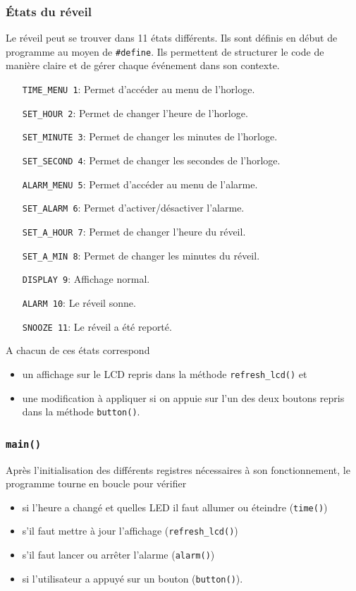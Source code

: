 \documentclass[12pt,a4paper]{article}
\begin{document}
    \subsubsection{\'Etats du réveil}
    Le réveil peut se trouver dans 11 états différents. Ils sont définis en début de programme au moyen de \texttt{\#define}. Ils permettent de structurer le code de manière claire et de gérer chaque événement dans son contexte.
    \begin{itemize}
    \item[\texttt{TIME\_MENU 1}:] Permet d'accéder au menu de l'horloge.
	\item[\texttt{SET\_HOUR 2}:] Permet de changer l'heure de l'horloge.
	\item[\texttt{SET\_MINUTE 3}:] Permet de changer les minutes de l'horloge.
	\item[\texttt{SET\_SECOND 4}:] Permet de changer les secondes de l'horloge.
	\item[\texttt{ALARM\_MENU 5}:] Permet d'accéder au menu de l'alarme.
	\item[\texttt{SET\_ALARM 6}:] Permet d'activer/désactiver l'alarme.
	\item[\texttt{SET\_A\_HOUR 7}:] Permet de changer l'heure du réveil.
	\item[\texttt{SET\_A\_MIN 8}:] Permet de changer les minutes du réveil.
	\item[\texttt{DISPLAY 9}:] Affichage normal.
	\item[\texttt{ALARM 10}:] Le réveil sonne.
	\item[\texttt{SNOOZE 11}:] Le réveil a été reporté.\\
    \end{itemize}
    
    A chacun de ces états correspond 
    \begin{itemize}
    \item un affichage sur le LCD repris dans la méthode \texttt{refresh\_lcd()} et
    \item une modification à appliquer si on appuie sur l'un des deux boutons repris dans la méthode \texttt{button()}.
    \end{itemize} 
    \subsubsection{\texttt{main()}}
    Après l'initialisation des différents registres nécessaires à son fonctionnement, le programme tourne en boucle pour vérifier
    \begin{itemize}
    \item si l'heure a changé et quelles LED il faut allumer ou éteindre (\texttt{time()})
    \item s'il faut mettre à jour l'affichage (\texttt{refresh\_lcd()})
    \item s'il faut lancer ou arrêter l'alarme (\texttt{alarm()})
    \item si l'utilisateur a appuyé sur un bouton (\texttt{button()}).
    \end{itemize}
    
\end{document}
